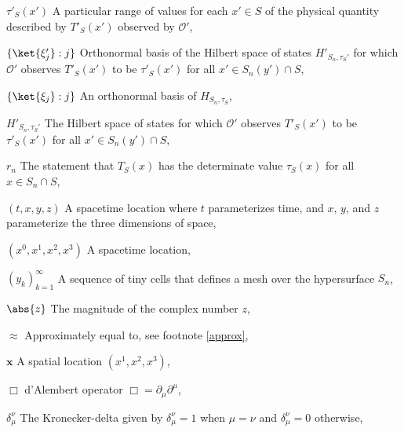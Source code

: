 
\begin{thenomenclature} 
  \item [{ $\tau'_S(x')$}]\begingroup A particular range of values for each $x'\in S$ of the physical quantity described by $T'_S(x')$ observed by $\mathcal{O}'$, \nomrefpage{}
  \item [{ $\{\ket{\xi_j'}:j\}$}]\begingroup Orthonormal basis of the Hilbert space of states $H'_{S_n,\tau_S'}$ for which $\mathcal{O}'$ observes $T'_S(x')$ to be $\tau'_S(x')$ for all $x'\in S_n(y')\cap S$, \nomrefpage{}
  \item [{ $\{\ket{\xi_j}:j\}$}]\begingroup An orthonormal basis of $H_{S_n,\tau_S}$, \nomrefpage{}
  \item [{ $H'_{S_n,\tau_S'}$}]\begingroup The Hilbert space of states for which $\mathcal{O}'$ observes $T'_S(x')$ to be $\tau'_S(x')$ for all $x'\in S_n(y')\cap S$, \nomrefpage{}
  \item [{ $r_n$}]\begingroup The statement that  $T_S(x)$ has the determinate value $\tau_S(x)$ for all $x\in S_n\cap S$, \nomrefpage{}
  \item [{$(t, x, y, z)$}]\begingroup A spacetime location where $t$ parameterizes time, and $x$, $y$, and $z$ parameterize the three dimensions of space, \nomrefpage {}
  \item [{$(x^0,x^1,x^2,x^3)$}]\begingroup A spacetime location, \nomrefpage{}
  \item [{$(y_k)_{k=1}^\infty$}]\begingroup A sequence of tiny cells that defines a mesh over the hypersurface $S_n$, \nomrefpage{}
  \item [{$\abs {z}$}]\begingroup The magnitude of the complex number $z$, \nomrefpage {}
  \item [{$\approx$}]\begingroup Approximately equal to, see footnote \ref{approx}, \nomrefpage{}
  \item [{$\bm{x}$}]\begingroup A spatial location $(x^1,x^2,x^3)$, \nomrefpage{}
  \item [{$\Box $}]\begingroup d'Alembert operator $\Box =\partial _\mu \partial ^\mu $, \nomrefpage {}
  \item [{$\delta^\nu_\mu$}]\begingroup The {Kronecker-delta} given by $\delta^\nu_\mu=1$ when $\mu=\nu$ and $\delta^\nu_\mu=0$ otherwise, \nomrefpage{}

\end{thenomenclature}
